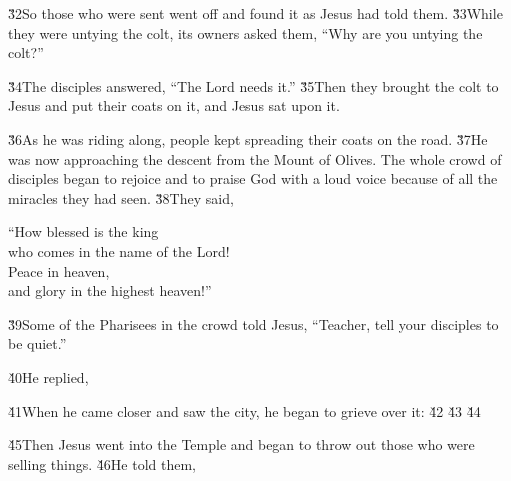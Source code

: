 \v{32}So those who were sent went off and found it as Jesus had told them. \v{33}While they were untying the colt, its owners asked them, ``Why are you untying the colt?''

\v{34}The disciples answered, ``The Lord needs it.'' \v{35}Then they brought the colt to Jesus and put their coats on it, and Jesus sat upon it.

\v{36}As he was riding along, people kept spreading their coats on the road. \v{37}He was now approaching the descent from the Mount of Olives. The whole crowd of disciples began to rejoice and to praise God with a loud voice because of all the miracles they had seen. \v{38}They said,

\begin{poetry}
\poeml ``How blessed is the king \\
\poemll    who comes in the name of the Lord! \\
\poeml Peace in heaven, \\
\poemll    and glory in the highest heaven!''
\end{poetry}

\v{39}Some of the Pharisees in the crowd told Jesus, ``Teacher, tell your disciples to be quiet.''

\v{40}He replied, 

\v{41}When he came closer and saw the city, he began to grieve over it: \v{42} \v{43} \v{44}

\v{45}Then Jesus went into the Temple and began to throw out those who were selling things. \v{46}He told them, 

